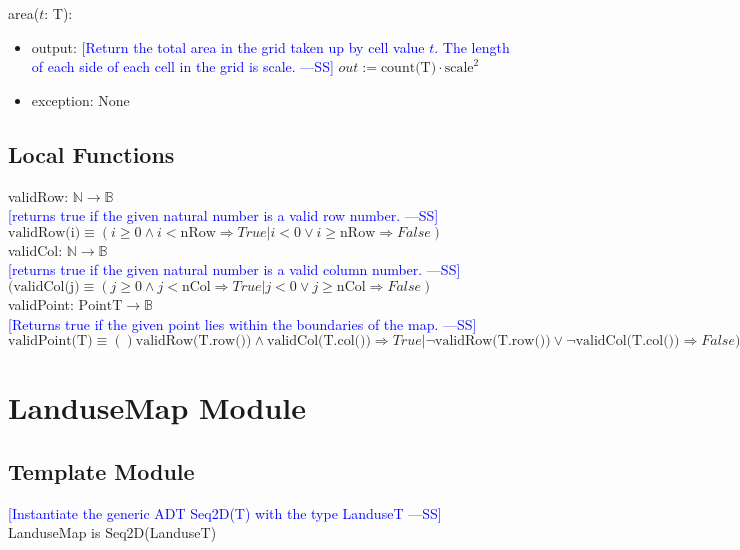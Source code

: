 \documentclass[12pt]{article}
\newcommand{\authornote}[3]{\textcolor{#1}{[#3 ---#2]}}
\newcommand{\authornote}[3]{}
\newcommand{\wss}[1]{\authornote{blue}{SS}{#1}}
\begin{document}
\noindent area($t$: T):
\begin{itemize}
\item output: \wss{Return the total area in the grid taken up by cell value $t$.
    The length of each side of each cell in the grid is
    scale.} $out := \text{count(T)} \cdot \text{scale}^2$
\item exception: None
\end{itemize}

\subsection*{Local Functions}

\noindent validRow: $\mathbb{N} \rightarrow \mathbb{B}$\\
\noindent \wss{returns true if the given natural number is a valid row
  number.}\\ $\text{validRow(i)} \equiv (i \geq 0 \wedge i < \text{nRow} \Rightarrow True | i < 0 \lor i \geq \text{nRow} \Rightarrow False)$\\

\noindent validCol: $\mathbb{N} \rightarrow \mathbb{B}$\\
\noindent \wss{returns true if the given natural number is a valid column
  number.}\\ $(\text{validCol(j)} \equiv (j \geq 0 \wedge j < \text{nCol} \Rightarrow True | j < 0 \lor j \geq \text{nCol} \Rightarrow False)$\\

\noindent validPoint: $\mbox{PointT} \rightarrow \mathbb{B}$\\
\noindent \wss{Returns true if the given point lies within the boundaries of the
  map.}\\ $\text{validPoint(T)} \equiv ()\text{validRow(T.row())} \wedge \text{validCol(T.col())} \Rightarrow True | \neg\text{validRow(T.row())} \lor \neg\text{validCol(T.col())} \Rightarrow False)$\\

\newpage

\section* {LanduseMap Module}

\subsection* {Template Module}

\wss{Instantiate the generic ADT Seq2D(T) with the type LanduseT}\\ LanduseMap is Seq2D(LanduseT)
\end{document}
